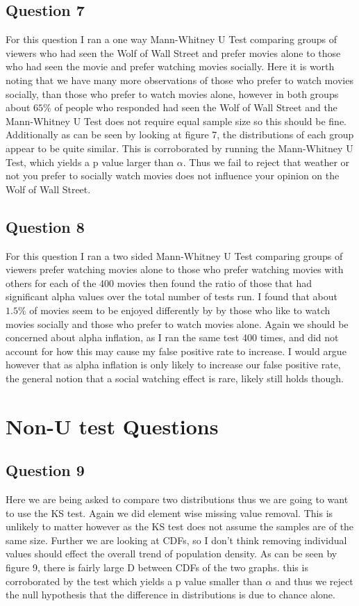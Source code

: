 \documentclass{article}
\begin{document}
\subsection*{Question 7}
For this question I ran a one way Mann-Whitney U Test comparing groups of viewers who had seen the Wolf of Wall Street and prefer movies alone to those who had seen the movie and prefer watching movies socially. Here it is worth noting that we have many more observations of those who prefer to watch movies socially, than those who prefer to watch movies alone, however in both groups about $65\%$ of people who responded had seen the Wolf of Wall Street and the Mann-Whitney U Test does not require equal sample size so this should be fine. Additionally as can be seen by looking at figure 7, the distributions of each group appear to be quite similar. This is corroborated by running the Mann-Whitney U Test, which yields a p value larger than $\alpha$. Thus we fail to reject that weather or not you prefer to socially watch movies does not influence your opinion on the Wolf of Wall Street.   

\subsection*{Question 8}

For this question I ran a two sided Mann-Whitney U Test comparing groups of viewers prefer watching movies alone to those who prefer watching movies with others for each of the 400 movies then found the ratio of those that had significant alpha values over the total number of tests run. I found that about $1.5\% $ of movies seem to be enjoyed differently by by those who like to watch movies socially and those who prefer to watch movies alone. Again we should be concerned about alpha inflation, as I ran the same test 400 times, and did not account for how this may cause my false positive rate to increase. I would argue however that as alpha inflation is only likely to increase our false positive rate, the general notion that a social watching effect is rare, likely still holds though.
\section*{Non-U test Questions}
\subsection*{Question 9}
Here we are being asked to compare two distributions thus we are going to want to use the KS test. Again we did element wise missing value removal. This is unlikely to matter however as the KS test does not assume the samples are of the same size. Further we are looking at CDFs, so I don't think removing individual values should effect the overall trend of population density. As can be seen by figure 9, there is fairly large D between CDFs of the two graphs. this is corroborated by the test which yields a p value smaller than $\alpha$ and thus we reject the null hypothesis that the difference in distributions is due to chance alone.   
\end{document}
